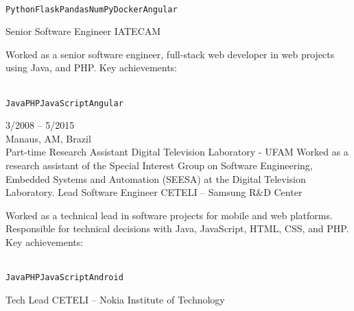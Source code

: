 \documentclass[9pt]{developercv} %
\begin{document}
\begin{entrylist}
{\begin{contributionlist}
    \end{contributionlist}\\
    \texttt{Python}\slashsep\texttt{Flask}\slashsep\texttt{Pandas}\slashsep\texttt{NumPy}\slashsep\texttt{Docker}\slashsep\texttt{Angular}}
  {Senior Software Engineer}
  {IATECAM}
  {
    Worked as a senior software engineer, full-stack web developer in web projects using Java, and PHP. Key achievements:\\
    \begin{contributionlist}
    \end{contributionlist}\\
    \texttt{Java}\slashsep\texttt{PHP}\slashsep\texttt{JavaScript}\slashsep\texttt{Angular}}
  \entry
  {3/2008 -- 5/2015\\\footnotesize{Manaus, AM, Brazil}\\\footnotesize{Part-time}}
  {Research Assistant}
  {Digital Television Laboratory - UFAM}
  {Worked as a research assistant of the Special Interest Group on Software Engineering, Embedded Systems and Automation (SEESA) at the Digital Television Laboratory.}
  {Lead Software Engineer}
  {CETELI -- Samsung R\&D Center}
  {
    Worked as a technical lead in software projects for mobile and web platforms. Responsible for technical decisions with Java, JavaScript, HTML, CSS, and PHP. Key achievements:\\
    \begin{contributionlist}
    \end{contributionlist}\\
    \texttt{Java}\slashsep\texttt{PHP}\slashsep\texttt{JavaScript}\slashsep\texttt{Android}}
  {Tech Lead}
  {CETELI -- Nokia Institute of Technology}

\end{entrylist}
\end{document}
